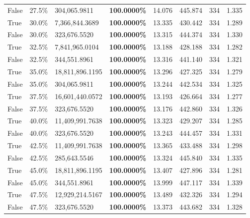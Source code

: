 \begin{table}[H]
\begin{tabular}{lllrllll}
\cline{1-8}
False & 27.5\% & 304,065.9811 & \bfseries \color{red} 100.0000\% & 14.076 & 445.874 & 334 & 1.335 \\
\cline{1-8}
True & 30.0\% & 7,366,844.3689 & \bfseries \color{red} 100.0000\% & 13.335 & 430.442 & 334 & 1.289 \\
\cline{1-8}
False & 30.0\% & 323,676.5520 & \bfseries \color{red} 100.0000\% & 13.315 & 444.374 & 334 & 1.330 \\
\cline{1-8}
True & 32.5\% & 7,841,965.0104 & \bfseries \color{red} 100.0000\% & 13.188 & 428.188 & 334 & 1.282 \\
\cline{1-8}
False & 32.5\% & 344,551.8961 & \bfseries \color{red} 100.0000\% & 13.316 & 441.140 & 334 & 1.321 \\
\cline{1-8}
True & 35.0\% & 18,811,896.1195 & \bfseries \color{red} 100.0000\% & 13.296 & 427.325 & 334 & 1.279 \\
\cline{1-8}
False & 35.0\% & 304,065.9811 & \bfseries \color{red} 100.0000\% & 13.244 & 442.534 & 334 & 1.325 \\
\cline{1-8}
True & 37.5\% & 16,601,440.0572 & \bfseries \color{red} 100.0000\% & 13.193 & 426.664 & 334 & 1.277 \\
\cline{1-8}
False & 37.5\% & 323,676.5520 & \bfseries \color{red} 100.0000\% & 13.176 & 442.860 & 334 & 1.326 \\
\cline{1-8}
True & 40.0\% & 11,409,991.7638 & \bfseries \color{red} 100.0000\% & 13.323 & 429.207 & 334 & 1.285 \\
\cline{1-8}
False & 40.0\% & 323,676.5520 & \bfseries \color{red} 100.0000\% & 13.243 & 444.457 & 334 & 1.331 \\
\cline{1-8}
True & 42.5\% & 11,409,991.7638 & \bfseries \color{red} 100.0000\% & 13.365 & 433.488 & 334 & 1.298 \\
\cline{1-8}
False & 42.5\% & \color{red} 285,643.5546 & \bfseries \color{red} 100.0000\% & 13.324 & 445.840 & 334 & 1.335 \\
\cline{1-8}
True & 45.0\% & 18,811,896.1195 & \bfseries \color{red} 100.0000\% & 13.407 & 427.896 & 334 & 1.281 \\
\cline{1-8}
False & 45.0\% & 344,551.8961 & \bfseries \color{red} 100.0000\% & 13.999 & 447.117 & 334 & 1.339 \\
\cline{1-8}
True & 47.5\% & 12,929,214.5167 & \bfseries \color{red} 100.0000\% & 13.489 & 432.326 & 334 & 1.294 \\
\cline{1-8}
False & 47.5\% & 323,676.5520 & \bfseries \color{red} 100.0000\% & 13.373 & 443.682 & 334 & 1.328 \\

\end{tabular}
\end{table}
